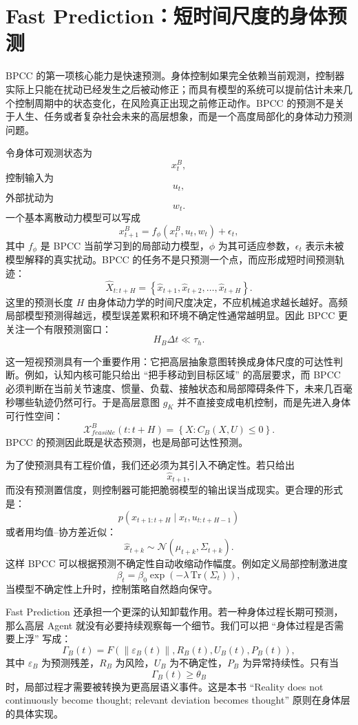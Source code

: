 \section{Fast Prediction：短时间尺度的身体预测}

BPCC 的第一项核心能力是快速预测。身体控制如果完全依赖当前观测，控制器实际上只能在扰动已经发生之后被动修正；而具有模型的系统可以提前估计未来几个控制周期中的状态变化，在风险真正出现之前修正动作。BPCC 的预测不是关于人生、任务或者复杂社会未来的高层想象，而是一个高度局部化的身体动力预测问题。

令身体可观测状态为
\[
x_t^B,
\]
控制输入为
\[
u_t,
\]
外部扰动为
\[
w_t.
\]
一个基本离散动力模型可以写成
\[
x_{t+1}^B
=
f_\phi(x_t^B,u_t,w_t)
+
\epsilon_t,
\]
其中 $f_\phi$ 是 BPCC 当前学习到的局部动力模型，$\phi$ 为其可适应参数，$\epsilon_t$ 表示未被模型解释的真实扰动。BPCC 的任务不是只预测一个点，而应形成短时间预测轨迹：
\[
\hat{X}_{t:t+H}
=
\left\{
\hat x_{t+1},
\hat x_{t+2},
\ldots,
\hat x_{t+H}
\right\}.
\]
这里的预测长度 $H$ 由身体动力学的时间尺度决定，不应机械追求越长越好。高频局部模型预测得越远，模型误差累积和环境不确定性通常越明显。因此 BPCC 更关注一个有限预测窗口：
\[
H_B\Delta t
\ll
\tau_h.
\]

这一短视预测具有一个重要作用：它把高层抽象意图转换成身体尺度的可达性判断。例如，认知内核可能只给出 ``把手移动到目标区域'' 的高层要求，而 BPCC 必须判断在当前关节速度、惯量、负载、接触状态和局部障碍条件下，未来几百毫秒哪些轨迹仍然可行。于是高层意图 $g_K$ 并不直接变成电机控制，而是先进入身体可行性空间：
\[
\mathcal X_{feasible}^{B}(t:t+H)
=
\left\{
X:
C_B(X,U)\leq 0
\right\}.
\]
BPCC 的预测因此既是状态预测，也是局部可达性预测。

为了使预测具有工程价值，我们还必须为其引入不确定性。若只给出
\[
\hat x_{t+1},
\]
而没有预测置信度，则控制器可能把脆弱模型的输出误当成现实。更合理的形式是：
\[
p(x_{t+1:t+H}
\mid
x_t,u_{t:t+H-1})
\]
或者用均值--协方差近似：
\[
\hat x_{t+k}
\sim
\mathcal N(\mu_{t+k},\Sigma_{t+k}).
\]
这样 BPCC 可以根据预测不确定性自动收缩动作幅度。例如定义局部控制激进度
\[
\beta_t
=
\beta_0
\exp(-\lambda\,\mathrm{Tr}(\Sigma_t)),
\]
当模型不确定性上升时，控制策略自然趋向保守。

Fast Prediction 还承担一个更深的认知卸载作用。若一种身体过程长期可预测，那么高层 Agent 就没有必要持续观察每一个细节。我们可以把 ``身体过程是否需要上浮'' 写成：
\[
\Gamma_B(t)
=
F(
\|\varepsilon_B(t)\|,
R_B(t),
U_B(t),
P_B(t)
),
\]
其中 $\varepsilon_B$ 为预测残差，$R_B$ 为风险，$U_B$ 为不确定性，$P_B$ 为异常持续性。只有当
\[
\Gamma_B(t)\geq\theta_B
\]
时，局部过程才需要被转换为更高层语义事件。这是本书 ``Reality does not continuously become thought; relevant deviation becomes thought'' 原则在身体层的具体实现。


